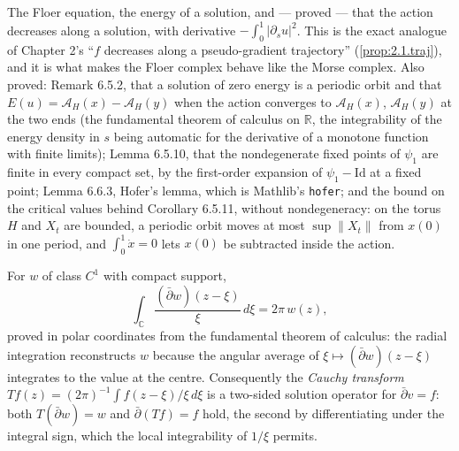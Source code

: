 \begin{definition}
  \label{def:6.4}
  \leanok
  The Floer equation, the energy of a solution, and --- proved --- that the
  action decreases along a solution, with derivative $-\int_0^1|\partial_s u|^2$.
  This is the exact analogue of Chapter 2's ``$f$ decreases along a
  pseudo-gradient trajectory'' (\ref{prop:2.1.traj}), and it is what makes the
  Floer complex behave like the Morse complex.  Also proved: Remark 6.5.2, that
  a solution of zero energy is a periodic orbit and that
  $E(u) = \mathcal{A}_H(x) - \mathcal{A}_H(y)$ when the action converges to
  $\mathcal{A}_H(x)$, $\mathcal{A}_H(y)$ at the two ends (the fundamental theorem
  of calculus on $\mathbb{R}$, the integrability of the energy density in $s$
  being automatic for the derivative of a monotone function with finite limits);
  Lemma 6.5.10, that the nondegenerate fixed points of $\psi_1$ are finite in
  every compact set, by the first-order expansion of $\psi_1 - \mathrm{Id}$ at a
  fixed point; Lemma 6.6.3, Hofer's lemma, which is Mathlib's \texttt{hofer};
  and the bound on the critical values behind Corollary 6.5.11, without
  nondegeneracy: on the torus $H$ and $X_t$ are bounded, a periodic orbit moves
  at most $\sup\|X_t\|$ from $x(0)$ in one period, and $\int_0^1 \dot x = 0$
  lets $x(0)$ be subtracted inside the action.
\end{definition}

\begin{theorem}
  \label{thm:cauchy-pompeiu}
  \leanok
  For $w$ of class $C^1$ with compact support,
  \[\int_{\mathbb{C}} \frac{(\bar\partial w)(z-\xi)}{\xi}\,d\xi = 2\pi\, w(z),\]
  proved in polar coordinates from the fundamental theorem of calculus: the
  radial integration reconstructs $w$ because the angular average of
  $\xi \mapsto (\bar\partial w)(z - \xi)$ integrates to the value at the centre.
  Consequently the \emph{Cauchy transform}
  $T f (z) = (2\pi)^{-1}\int f(z-\xi)/\xi \,d\xi$ is a two-sided solution
  operator for $\bar\partial v = f$: both $T(\bar\partial w) = w$ and
  $\bar\partial(T f) = f$ hold, the second by differentiating under the integral
  sign, which the local integrability of $1/\xi$ permits.
\end{theorem}

